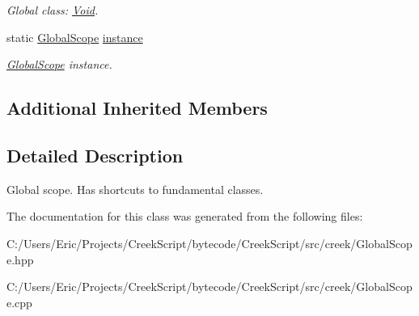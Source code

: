 \begin{DoxyCompactItemize}
\begin{DoxyCompactList}\small\item\em Global class\+: \hyperlink{classcreek_1_1_void}{Void}. \end{DoxyCompactList}\item 
static \hyperlink{classcreek_1_1_global_scope}{Global\+Scope} \hyperlink{classcreek_1_1_global_scope_ac2f1a20092a30fc36ba4983be3f30db6}{instance}\hypertarget{classcreek_1_1_global_scope_ac2f1a20092a30fc36ba4983be3f30db6}{}\label{classcreek_1_1_global_scope_ac2f1a20092a30fc36ba4983be3f30db6}

\begin{DoxyCompactList}\small\item\em {\ttfamily \hyperlink{classcreek_1_1_global_scope}{Global\+Scope}} instance. \end{DoxyCompactList}\end{DoxyCompactItemize}
\subsection*{Additional Inherited Members}


\subsection{Detailed Description}
Global scope. Has shortcuts to fundamental classes. 

The documentation for this class was generated from the following files\+:\begin{DoxyCompactItemize}
\item 
C\+:/\+Users/\+Eric/\+Projects/\+Creek\+Script/bytecode/\+Creek\+Script/src/creek/Global\+Scope.\+hpp\item 
C\+:/\+Users/\+Eric/\+Projects/\+Creek\+Script/bytecode/\+Creek\+Script/src/creek/Global\+Scope.\+cpp\end{DoxyCompactItemize}
